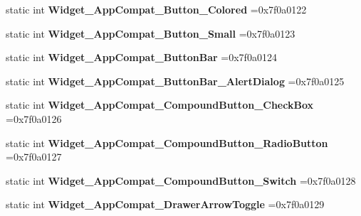 \begin{DoxyCompactItemize}
static int {\bfseries Widget\+\_\+\+App\+Compat\+\_\+\+Button\+\_\+\+Colored} =0x7f0a0122
\item 
\mbox{\label{classandroid_1_1support_1_1v4_1_1R_1_1style_a478eddac13c2275c3240d522954d86c4}} 
static int {\bfseries Widget\+\_\+\+App\+Compat\+\_\+\+Button\+\_\+\+Small} =0x7f0a0123
\item 
\mbox{\label{classandroid_1_1support_1_1v4_1_1R_1_1style_a55a8d011dd810b247b139372113a3bd6}} 
static int {\bfseries Widget\+\_\+\+App\+Compat\+\_\+\+Button\+Bar} =0x7f0a0124
\item 
\mbox{\label{classandroid_1_1support_1_1v4_1_1R_1_1style_a87964b937e1a28c203bf028365b2956c}} 
static int {\bfseries Widget\+\_\+\+App\+Compat\+\_\+\+Button\+Bar\+\_\+\+Alert\+Dialog} =0x7f0a0125
\item 
\mbox{\label{classandroid_1_1support_1_1v4_1_1R_1_1style_a9a9a09d0c6dc9d966f758b17afafc52b}} 
static int {\bfseries Widget\+\_\+\+App\+Compat\+\_\+\+Compound\+Button\+\_\+\+Check\+Box} =0x7f0a0126
\item 
\mbox{\label{classandroid_1_1support_1_1v4_1_1R_1_1style_a5f68c5a5ba86997abb5330b2beb89f17}} 
static int {\bfseries Widget\+\_\+\+App\+Compat\+\_\+\+Compound\+Button\+\_\+\+Radio\+Button} =0x7f0a0127
\item 
\mbox{\label{classandroid_1_1support_1_1v4_1_1R_1_1style_aa833a13f02a6130a726153471d7e9d46}} 
static int {\bfseries Widget\+\_\+\+App\+Compat\+\_\+\+Compound\+Button\+\_\+\+Switch} =0x7f0a0128
\item 
\mbox{\label{classandroid_1_1support_1_1v4_1_1R_1_1style_ae06caa755ad438597bbc2cfadb8283dc}} 
static int {\bfseries Widget\+\_\+\+App\+Compat\+\_\+\+Drawer\+Arrow\+Toggle} =0x7f0a0129
\item 
\mbox{\label{classandroid_1_1support_1_1v4_1_1R_1_1style_a0660588a57bc67be0ea7bdd1550425c4}} 

\end{DoxyCompactItemize}
